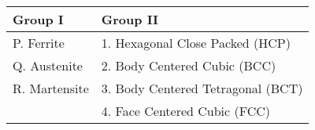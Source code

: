 \begin{center}
\begin{tabular}{|l|l|}
\hline
    \textbf{Group I} & \textbf{Group II} \\      \hline
     P. Ferrite & 1. Hexagonal Close Packed (HCP) \\  \hline
    Q. Austenite & 2. Body Centered Cubic (BCC) \\     \hline
    R. Martensite & 3. Body Centered Tetragonal (BCT) \\   \hline
  &  4. Face Centered Cubic (FCC) \\  \hline
\end{tabular}
\end{center}